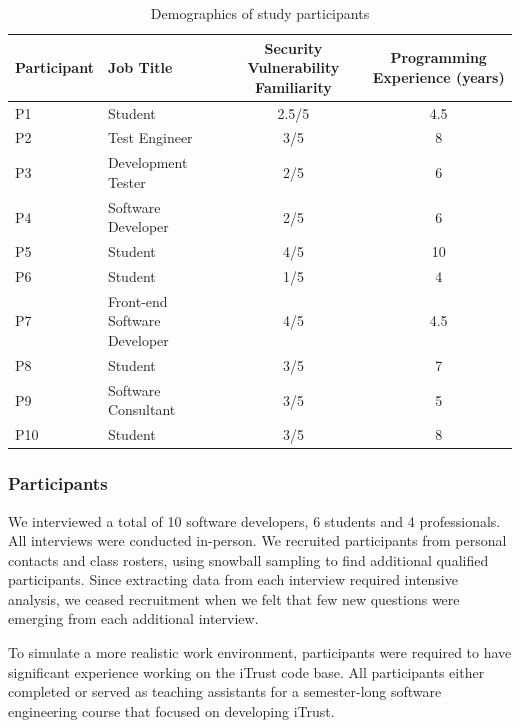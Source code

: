 \documentclass[conference]{IEEEtran}
\begin{document}
\begin{table} 
\centering
\caption{Demographics of study participants}
\begin{tabular}{|l|l|c|c|}
\rowcolor{gray!50}
\hline
    Participant			& Job Title 						& Security Vulnerability Familiarity 					& Programming Experience (years) \\
    \hline
    P1			    	& Student     			& 2.5/5												 	&  4.5    \\
    \hline
    P2			    	& Test Engineer    			& 3/5									    			&  8 		\\
    \hline
    P3 					& Development Tester       			& 2/5													&  6 	    	\\
    \hline
    P4					& Software Developer     			& 2/5				 									&  6     	\\
    \hline
    P5					& Student      			& 4/5													&  10 	\\
    \hline
    P6					& Student		    				& 1/5							    					& 4		\\
    \hline
    P7					& Front-end Software Developer    	& 4/5													& 4.5              \\
    \hline
    P8					& Student	    		& 3/5													& 7   \\
    \hline
    P9					& Software Consultant   	 		& 3/5													& 5	  		 \\
    \hline
    P10			    	& Student    			& 3/5										 			& 8	              \\
    \hline
\end{tabular}
\label{table:participants}
\end{table}



\subsubsection{Participants}

We interviewed a total of 10 software developers, 6 students and 4 professionals. 
All interviews were conducted in-person.
We recruited participants from personal contacts and class rosters, using snowball sampling to find additional qualified participants.
Since extracting data from each interview required intensive analysis, we ceased recruitment when we felt that few new questions were emerging from each additional interview.

To simulate a more realistic work environment, participants were required to have significant experience working on the iTrust code base. 
All participants either completed or served as teaching assistants for a semester-long software engineering course that focused on developing iTrust.
\end{document}
